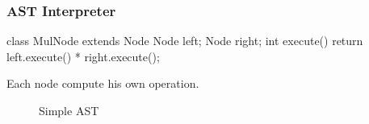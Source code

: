 \documentclass[11pt,handout]{beamer}
\begin{document}
\begin{frame}[c,fragile]
  \frametitle{AST Interpreter}

  \begin{minipage}[t]{0.48\textwidth}
\begin{javacode}
class MulNode extends Node {
  Node left;
  Node right;
  int execute() {
    return left.execute() *
           right.execute();
  }
}
\end{javacode}

    Each node compute his own operation.
    
  \end{minipage}
  \hfill
  \begin{minipage}[t]{0.48\textwidth}
  \begin{figure}[ht]
    \centering
    \caption{Simple AST}
    \label{fig:ast-interpreter}
  \end{figure}
  \end{minipage}
\end{frame}

\end{document}
